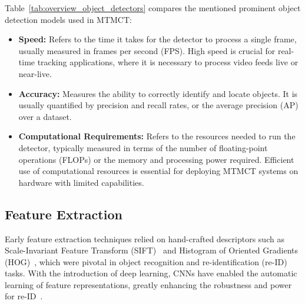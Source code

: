 \begin{table}[ht]
    \centering
    \caption{Overview Object Detectors}\label{tab:overview_object_detectors}
\end{table}

Table~\ref{tab:overview_object_detectors} compares the mentioned prominent object detection models used in MTMCT:

\begin{itemize}
    \item \textbf{Speed:} Refers to the time it takes for the detector to process a single frame, usually measured in frames per second (FPS). High speed is crucial for real-time tracking applications, where it is necessary to process video feeds live or near-live.
    \item \textbf{Accuracy:} Measures the ability to correctly identify and locate objects. It is usually quantified by precision and recall rates, or the average precision (AP) over a dataset.
    \item \textbf{Computational Requirements:} Refers to the resources needed to run the detector, typically measured in terms of the number of floating-point operations (FLOPs) or the memory and processing power required. Efficient use of computational resources is essential for deploying MTMCT systems on hardware with limited capabilities.
\end{itemize}

\subsection{Feature Extraction}\label{subsec:milestone:eature_extraction}
Early feature extraction techniques relied on hand-crafted descriptors such as Scale-Invariant Feature Transform (SIFT)~\cite{Lowe04} and Histogram of Oriented Gradients (HOG)~\cite{Dalal05}, which were pivotal in object recognition and re-identification (re-ID) tasks. With the introduction of deep learning, CNNs have enabled the automatic learning of feature representations, greatly enhancing the robustness and power for re-ID~\cite{Krizhevsky12, He16}.

